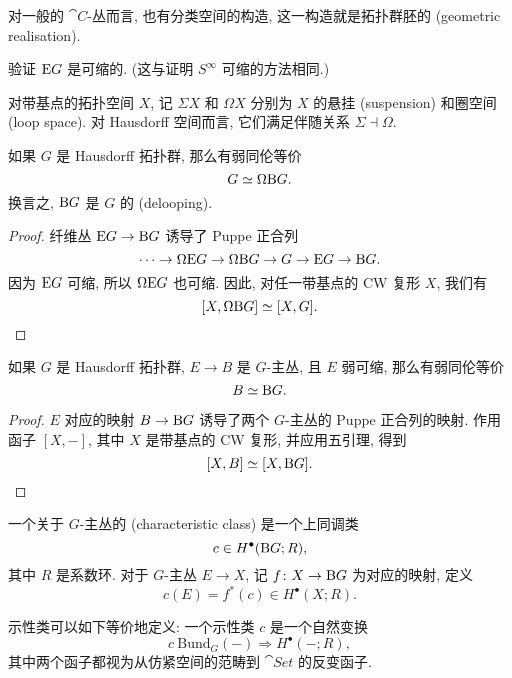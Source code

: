 \begin{remark}
    对一般的 $\cat{C}$-丛而言, 也有分类空间的构造,
    这一构造就是拓扑群胚的 (geometric realisation). \varqed
\end{remark}

\begin{exercise}
    验证 $\mathrm{E} G$ 是可缩的.
    (这与证明 $S^\infty$ 可缩的方法相同.) \varqed
\end{exercise}

对带基点的拓扑空间 $X$, 
记 $\Sigma X$ 和 $\Omega X$
分别为 $X$ 的悬挂 (suspension) 和圈空间 (loop space). 
对 Hausdorff 空间而言, 它们满足伴随关系 $\Sigma \dashv \Omega$. 

\begin{proposition}
    如果 $G$ 是 Hausdorff 拓扑群, 那么有弱同伦等价
    \[ G \simeq \Omega \mathrm{B} G. \]
    换言之, $\mathrm{B} G$ 是 $G$ 的 (delooping). 
\end{proposition}

\begin{proof}
    纤维丛 $\mathrm{E} G \to \mathrm{B} G$ 诱导了 Puppe 正合列
    \[ 
        \cdots \to \Omega \mathrm{E} G \to \Omega \mathrm{B} G
        \to G \to \mathrm{E} G \to \mathrm{B} G.
    \]
    因为 $\mathrm{E} G$ 可缩, 所以 $\Omega\mathrm{E} G$ 也可缩. 
    因此, 对任一带基点的 CW 复形 $X$, 我们有
    \[ [X, \Omega \mathrm{B} G] \simeq [X, G]. \qedhere \]
\end{proof}

\begin{proposition} \label{thm-1-contractible}
    如果 $G$ 是 Hausdorff 拓扑群, $E \to B$ 是 $G$-主丛, 
    且 $E$ 弱可缩, 那么有弱同伦等价
    \[ B \simeq \mathrm{B} G. \]
\end{proposition}

\begin{proof}
    $E$ 对应的映射 $B \to \mathrm{B} G$ 诱导了两个 $G$-主丛的 Puppe 正合列的映射. 
    作用函子 $[X, {-}]$, 其中 $X$ 是带基点的 CW 复形, 并应用五引理, 得到
    \[ [X, B] \simeq [X, \mathrm{B} G]. \qedhere \]
\end{proof}

\begin{definition}
    一个关于 $G$-主丛的 (characteristic class) 是一个上同调类
    \[ c \in H^\bullet(\mathrm{B} G; R), \]
    其中 $R$ 是系数环. 
    对于 $G$-主丛 $E \to X$,
    记 $f \colon X \to \mathrm{B} G$ 为对应的映射, 定义
    \[ c(E) = f^*(c) \in H^\bullet(X; R). \]
\end{definition}

\begin{exercise}
    示性类可以如下等价地定义: 一个示性类 $c$ 是一个自然变换
    \[ c \: \mathrm{Bund}_G(-) \Rightarrow H^\bullet(-; R), \]
    其中两个函子都视为从仿紧空间的范畴到 $\cat{Set}$ 的反变函子. \varqed
\end{exercise}

